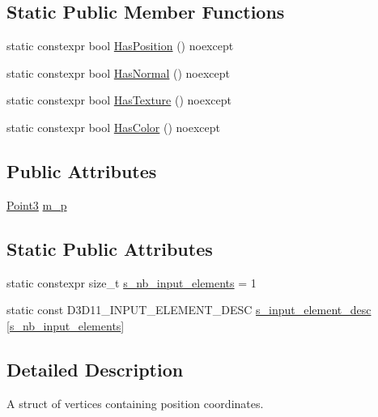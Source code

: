 \subsection*{Static Public Member Functions}
\begin{DoxyCompactItemize}
\item 
static constexpr bool \hyperlink{structmage_1_1_vertex_position_ab99ff01bb689bf62f693f13212d673ad}{Has\+Position} () noexcept
\item 
static constexpr bool \hyperlink{structmage_1_1_vertex_position_ac67b22c20ae993660be823e8e1d9b52d}{Has\+Normal} () noexcept
\item 
static constexpr bool \hyperlink{structmage_1_1_vertex_position_a593c015184b164cf9bcf82938d4db39f}{Has\+Texture} () noexcept
\item 
static constexpr bool \hyperlink{structmage_1_1_vertex_position_a93f07ce2967b0ae2d22dede08b4fd3e0}{Has\+Color} () noexcept
\end{DoxyCompactItemize}
\subsection*{Public Attributes}
\begin{DoxyCompactItemize}
\item 
\hyperlink{structmage_1_1_point3}{Point3} \hyperlink{structmage_1_1_vertex_position_af752daea9af1272dba3d3da256e0aaa2}{m\+\_\+p}
\end{DoxyCompactItemize}
\subsection*{Static Public Attributes}
\begin{DoxyCompactItemize}
\item 
static constexpr size\+\_\+t \hyperlink{structmage_1_1_vertex_position_a250e2e24576b67c4970717a1419af9e2}{s\+\_\+nb\+\_\+input\+\_\+elements} = 1
\item 
static const D3\+D11\+\_\+\+I\+N\+P\+U\+T\+\_\+\+E\+L\+E\+M\+E\+N\+T\+\_\+\+D\+E\+SC \hyperlink{structmage_1_1_vertex_position_a4e43cd06303beccd4791fdec9a13c47f}{s\+\_\+input\+\_\+element\+\_\+desc} \mbox{[}\hyperlink{structmage_1_1_vertex_position_a250e2e24576b67c4970717a1419af9e2}{s\+\_\+nb\+\_\+input\+\_\+elements}\mbox{]}
\end{DoxyCompactItemize}


\subsection{Detailed Description}
A struct of vertices containing position coordinates. 

